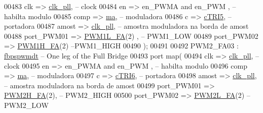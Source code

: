 \begin{DoxyCode}
00483          clk => \hyperlink{class_d_e0___n_a_n_o___v_f_1_1_m_a_i_n_a1d63ebfc050c1099e1dff991817ec3b0}{clk\_pll},\textcolor{keyword}{ -- clock}
00484          en => en\_PWMA \textcolor{keywordflow}{and} en\_PWM  ,\textcolor{keyword}{ -- habilta modulo}
00485          comp  => \hyperlink{class_d_e0___n_a_n_o___v_f_1_1_m_a_i_n_a02405666f0ec5525888d897c8ddb079f}{ma},\textcolor{keyword}{ -- moduladora     }
00486          c => \hyperlink{class_d_e0___n_a_n_o___v_f_1_1_m_a_i_n_abc70ad694fb9be4565a31c4cde31d225}{cTRI5},\textcolor{keyword}{ -- portadora}
00487          amost => \hyperlink{class_d_e0___n_a_n_o___v_f_1_1_m_a_i_n_a1d63ebfc050c1099e1dff991817ec3b0}{clk\_pll},\textcolor{keyword}{ -- amostra moduladora na borda de amost}
00488          port\_PWM01  => \hyperlink{class_d_e0___n_a_n_o___v_f_a292e884f4d72fca8a1bec36c11933ef7}{PWM1L\_FA}\textcolor{vhdlchar}{(}\textcolor{vhdllogic}{2}\textcolor{vhdlchar}{)} ,\textcolor{keyword}{ -- PWM1\_LOW}
00489          port\_PWM02 => \hyperlink{class_d_e0___n_a_n_o___v_f_af21e77adde949f9a9a599f25976a6a74}{PWM1H\_FA}\textcolor{vhdlchar}{(}\textcolor{vhdllogic}{2}\textcolor{vhdlchar}{)}\textcolor{keyword}{   --PWM1\_HIGH}
00490          \textcolor{vhdlchar}{)};  
00491         
00492 PWM2\_FA03 : \hyperlink{classfbpspwmdt}{fbpspwmdt} -- One leg \textcolor{keywordflow}{of} the Full Bridge
00493     \textcolor{keywordflow}{port} \textcolor{keywordflow}{map}( 
00494          clk => \hyperlink{class_d_e0___n_a_n_o___v_f_1_1_m_a_i_n_a1d63ebfc050c1099e1dff991817ec3b0}{clk\_pll},\textcolor{keyword}{ -- clock}
00495          en => en\_PWMA \textcolor{keywordflow}{and} en\_PWM  ,\textcolor{keyword}{ -- habilta modulo}
00496          comp  => \hyperlink{class_d_e0___n_a_n_o___v_f_1_1_m_a_i_n_a02405666f0ec5525888d897c8ddb079f}{ma},\textcolor{keyword}{ -- moduladora     }
00497          c => \hyperlink{class_d_e0___n_a_n_o___v_f_1_1_m_a_i_n_a3fba77c2013e6f78c5035b08503b220c}{cTRI6},\textcolor{keyword}{ -- portadora}
00498          amost => \hyperlink{class_d_e0___n_a_n_o___v_f_1_1_m_a_i_n_a1d63ebfc050c1099e1dff991817ec3b0}{clk\_pll},\textcolor{keyword}{ -- amostra moduladora na borda de amost}
00499          port\_PWM01  => \hyperlink{class_d_e0___n_a_n_o___v_f_a3a05a366015b8398929044188870fa7b}{PWM2H\_FA}\textcolor{vhdlchar}{(}\textcolor{vhdllogic}{2}\textcolor{vhdlchar}{)},\textcolor{keyword}{ -- PWM2\_HIGH}
00500          port\_PWM02 => \hyperlink{class_d_e0___n_a_n_o___v_f_a357d73a496027c4f7000298ecdc41a05}{PWM2L\_FA}\textcolor{vhdlchar}{(}\textcolor{vhdllogic}{2}\textcolor{vhdlchar}{)}\textcolor{keyword}{   -- PWM2\_LOW}

\end{DoxyCode}

